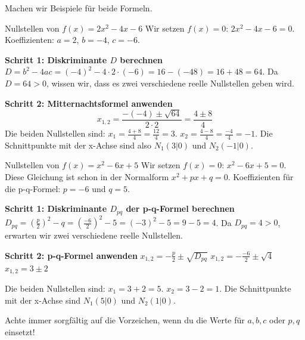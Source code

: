 Machen wir Beispiele für beide Formeln.

\begin{beispielumgebung}{Nullstellen von $f(x) = 2x^2 - 4x - 6$}
Wir setzen $f(x)=0$: $2x^2 - 4x - 6 = 0$.
Koeffizienten: $a=2$, $b=-4$, $c=-6$.

\textbf{Schritt 1: Diskriminante $D$ berechnen}
$D = b^2 - 4ac = (-4)^2 - 4 \cdot 2 \cdot (-6) = 16 - (-48) = 16 + 48 = 64$.
Da $D=64 > 0$, wissen wir, dass es zwei verschiedene reelle Nullstellen geben wird.

\textbf{Schritt 2: Mitternachtsformel anwenden}
\[ x_{1,2} = \frac{-(-4) \pm \sqrt{64}}{2 \cdot 2} = \frac{4 \pm 8}{4} \]
Die beiden Nullstellen sind:
$x_1 = \frac{4 + 8}{4} = \frac{12}{4} = 3$.
$x_2 = \frac{4 - 8}{4} = \frac{-4}{4} = -1$.
Die Schnittpunkte mit der x-Achse sind also $N_1(3|0)$ und $N_2(-1|0)$.
\end{beispielumgebung}

\begin{beispielumgebung}{Nullstellen von $f(x) = x^2 - 6x + 5$}
Wir setzen $f(x)=0$: $x^2 - 6x + 5 = 0$.
Diese Gleichung ist schon in der Normalform $x^2+px+q=0$.
Koeffizienten für die p-q-Formel: $p=-6$ und $q=5$.

\textbf{Schritt 1: Diskriminante $D_{pq}$ der p-q-Formel berechnen}
$D_{pq} = \left(\frac{p}{2}\right)^2 - q = \left(\frac{-6}{2}\right)^2 - 5 = (-3)^2 - 5 = 9 - 5 = 4$.
Da $D_{pq}=4 > 0$, erwarten wir zwei verschiedene reelle Nullstellen.

\textbf{Schritt 2: p-q-Formel anwenden}
$x_{1,2} = -\frac{p}{2} \pm \sqrt{D_{pq}}$
$x_{1,2} = -\frac{-6}{2} \pm \sqrt{4}$
$x_{1,2} = 3 \pm 2$

Die beiden Nullstellen sind:
$x_1 = 3 + 2 = 5$.
$x_2 = 3 - 2 = 1$.
Die Schnittpunkte mit der x-Achse sind $N_1(5|0)$ und $N_2(1|0)$.
\end{beispielumgebung}

Achte immer sorgfältig auf die Vorzeichen, wenn du die Werte für $a,b,c$ oder $p,q$ einsetzt!

